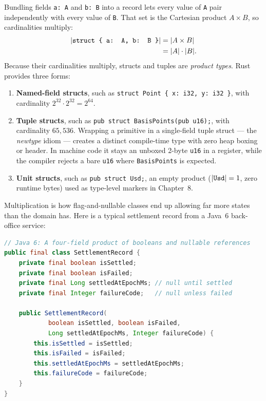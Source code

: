 Bundling fields \texttt{a: A} and \texttt{b: B} into a record lets every value of \texttt{A} pair independently with every value of \texttt{B}. That set is the Cartesian product $A \times B$, so cardinalities multiply:
\begin{align*}
  \lvert\texttt{struct \{ a: A, b: B \}}\rvert &= \lvert A \times B\rvert \\
  &= \lvert A\rvert \cdot \lvert B\rvert.
\end{align*}
Because their cardinalities multiply, structs and tuples are \emph{product types}. Rust provides three forms:
\begin{enumerate}
  \item \textbf{Named-field structs}, such as \texttt{struct Point \{ x: i32, y: i32 \}}, with cardinality $2^{32} \cdot 2^{32} = 2^{64}$.
  \item \textbf{Tuple structs}, such as \texttt{pub struct BasisPoints(pub u16);}, with cardinality $65{,}536$. Wrapping a primitive in a single-field tuple struct --- the \emph{newtype} idiom --- creates a distinct compile-time type with zero heap boxing or header. In machine code it stays an unboxed 2-byte \texttt{u16} in a register, while the compiler rejects a bare \texttt{u16} where \texttt{BasisPoints} is expected.
  \item \textbf{Unit structs}, such as \texttt{pub struct Usd;}, an empty product ($\lvert\texttt{Usd}\rvert = 1$, zero runtime bytes) used as type-level markers in Chapter~8.
\end{enumerate}

Multiplication is how flag-and-nullable classes end up allowing far more states than the domain has. Here is a typical settlement record from a Java~6 back-office service:

\begin{lstlisting}[language=Java]
// Java 6: A four-field product of booleans and nullable references
public final class SettlementRecord {
    private final boolean isSettled;
    private final boolean isFailed;
    private final Long settledAtEpochMs; // null until settled
    private final Integer failureCode;   // null unless failed

    public SettlementRecord(
            boolean isSettled, boolean isFailed,
            Long settledAtEpochMs, Integer failureCode) {
        this.isSettled = isSettled;
        this.isFailed = isFailed;
        this.settledAtEpochMs = settledAtEpochMs;
        this.failureCode = failureCode;
    }
}
\end{lstlisting}


